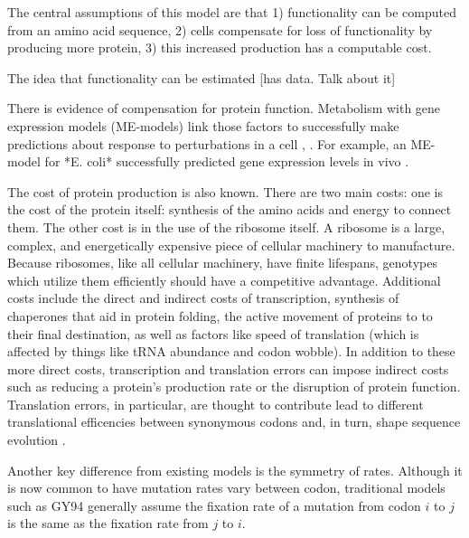 \documentclass[12pt,letterpaper]{article}
\begin{document}
{The central assumptions of this model are that 1) functionality can be computed from an amino acid sequence, 2) cells compensate for loss of functionality by producing more protein, 3) this increased production has a computable cost.

The idea that functionality can be estimated [has data. Talk about it]

There is evidence of compensation for protein function. Metabolism with gene expression models (ME-models) link those factors to successfully make predictions about response to perturbations in a cell \citep{https://www.nature.com/articles/ncomms1928}, \citep{https://www.sciencedirect.com/science/article/pii/S0958166914002316}. For example, an ME-model for *E. coli* successfully predicted gene expression levels in vivo \citep{http://journals.plos.org/plosone/article?id=10.1371/journal.pone.0045635}.

The cost of protein production is also known.
There are two main costs: one is the cost of the protein itself: synthesis of the amino acids and energy to connect them. The other cost is in the use of the ribosome itself.
A ribosome is a large, complex, and energetically expensive piece of cellular machinery to manufacture.
Because ribosomes, like all cellular machinery, have finite lifespans, genotypes which utilize them efficiently should have a competitive advantage.
Additional costs include the direct and indirect costs of transcription, synthesis of chaperones that aid in protein folding, the active movement of proteins to to their final destination, as well as factors like speed of translation (which is affected by things like tRNA abundance and codon wobble).
In addition to these more direct costs, transcription and translation errors can impose indirect costs such as reducing a protein's production rate or the disruption of protein function.
Translation errors, in particular, are thought to contribute lead to different translational efficencies between synonymous codons and, in turn, shape sequence evolution \citep{Kurland1991,Gilchrist2007,PlaceHolderRef}.

Another key difference from existing models is the symmetry of rates.
Although it is now common to have mutation rates vary between codon, traditional models such as GY94 generally assume the fixation rate of a mutation from codon $i$ to $j$ is the same as the fixation rate from $j$ to $i$.


}
\end{document}
